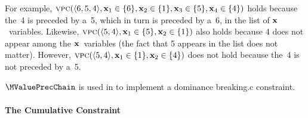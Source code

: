 For example, \mbox{$\mValuePrecChain(\langle 6, 5, 4 \rangle, \mVar{x}_1 \in
  \mSet{6}, \mVar{x}_2 \in \mSet{1}, \mVar{x}_3 \in \mSet{5}, \mVar{x}_4 \in
  \mSet{4})$} holds because the~\num{4} is preceded by a~\num{5}, which in turn
is preceded by a~\num{6}, in the list of $\mVar{x}$~\glspl{variable}.
%
Likewise, \mbox{$\mValuePrecChain(\langle 5, 4 \rangle, \mVar{x}_1 \in \mSet{5},
  \mVar{x}_2 \in \mSet{1})$} also holds because \num{4} does not appear among
the $\mVar{x}$~\glspl{variable} (the fact that \num{5} appears in the list does
not matter).
%
However, \mbox{$\mValuePrecChain(\langle 5, 4 \rangle, \mVar{x}_1 \in \mSet{1},
  \mVar{x}_2 \in \mSet{4})$} does not hold because the~\num{4} is not preceded
by a~\num{5}.

$\MValuePrecChain$ is used in  to implement a
\gls{dominance breaking.c} \gls{constraint}.


\paragraph{The Cumulative Constraint}

